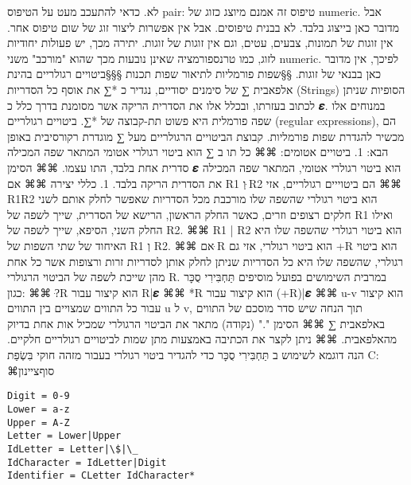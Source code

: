       לא.  כדאי להתעכב מעט על הטיפוס pair: טיפוס זה אמנם מיוצג כזוג של numeric.
      אבל מדובר כאן בייצוג בלבד. לא בבנית טיפוסים. אבל אין אפשרות ליצור זוג של
      שום טיפוס אחר. אין זוגות של תמונות, צבעים, עטים, וגם אין זוגות של זוגות.
      יתירה מכך, יש פעולות יחודיות לזוג, כמו טרנספורמציה שאינן נובעות מכך שהוא
      "מורכב" משני numeric. לפיכך, אין מדובר כאן בבנאי של זוגות.
      §§שפות פורמליות לתיאור שפות תכנות
      §§§ביטויים רגולריים
      בהינת אלפאבית ∑ של סימנים יסודיים, נגדיר כ *∑ את אוסף כל הסדריות (Strings) הסופיות שניתן לכתוב בעזרתו, ובכלל אלו את הסדרית הריקה אשר מסומנת בדרך כלל כ 𝜺. במנוחים אלו שפה פורמלית היא פשוט תת-קבוצה של *∑. ביטויים רגולריים (regular expressions), הם מכשיר להגדרת שפות פורמליות.
      קבוצת הביטויים הרגולריים מעל ∑ מוגדרת רקורסיבית באופן הבא:
      1. ביטויים אטומים:
      ⌘⌘ כל תו ב ∑ הוא ביטוי רגולרי אטומי המתאר שפה המכילה סדרית אחת בלבד, התו עצמו.
      ⌘⌘ הסימן 𝜺 הוא ביטוי רגולרי אטומי, המתאר שפה המכילה את הסדרית הריקה בלבד.
      1. כללי יצירה
      ⌘⌘ אם R1 וְ ּR2 הם ביטוייים רגולריים, אזי
      ⌘⌘ R1R2 הוא ביטוי רגולרי שהשפה שלו מורכבת מכל הסדריות שאפשר לחלק אותם לשני חלקים רצופים וזרים, כאשר החלק הראשון, הרישא של הסדרית, שייך לשפה של R1 ואילו החלק השני, הסיפא, שייך לשפה של R2.
      ⌘⌘ R1 | R2 הוא ביטוי רגולרי שהשפה שלו היא האיחוד של שתי השפות של R1 וְ R2.
      ⌘⌘ אם ּR הוא ביטוי רגולרי, אזי גם +R הוא ביטוי רגולרי, שהשפה שלו היא כל הסדריות שניתן לחלק אותן לסדריות זרות ורצופות אשר כל אחת מהן שייכת לשפה של הביטוי הרגולרי R.
      במרבית השימושים בפועל מוסיפים תַּחְבִּירִי סֻכָּר כגון:
      ⌘⌘ ?ּR הוא קיצור עבור R|𝜺
      ⌘⌘ *R הוא קיצור עבור (+R)|𝜺
      ⌘⌘ u-v הוא קיצור עבור כל התווים שמצויים בין התווים u ל v, תוך הנחה שיש סדר מוסכם של התווים באלפאבית ∑
      ⌘⌘ הסימן "." (נקודה) מתאר את הביטוי הרגולרי שמכיל אות אחת בדיוק מהאלפאבית.
      ⌘⌘ ניתן לקצר את הכתיבה באמצעות מתן שמות לביטויים רגולריים חלקיים.
      הנה דוגמא לשימוש ב תַּחְבִּירִי סֻכָּר כדי להגדיר ביטוי רגולרי בעבור מזהה חוקי בִּשְׂפַת C:
  ⌘סוף{ציינון}
\begin{verbatim}
Digit = 0-9
Lower = a-z
Upper = A-Z
Letter = Lower|Upper
IdLetter = Letter|\$|\_
IdCharacter = IdLetter|Digit
Identifier = CLetter IdCharacter*
\end{verbatim}

